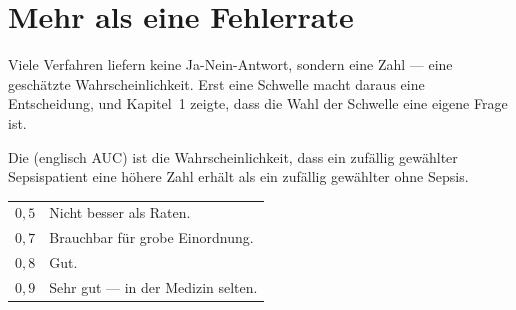 \section{Mehr als eine Fehlerrate}

\begin{merksatz}
Viele Verfahren liefern keine Ja-Nein-Antwort, sondern eine Zahl --- eine geschätzte Wahrscheinlichkeit. Erst eine Schwelle macht daraus eine Entscheidung, und Kapitel~1 zeigte, dass die Wahl der Schwelle eine eigene Frage ist.

\begin{definition}
Die  (englisch AUC) ist die Wahrscheinlichkeit, dass ein zufällig gewählter Sepsispatient eine höhere Zahl erhält als ein zufällig gewählter ohne Sepsis.
\end{definition}

\begin{center}
{\small
\renewcommand{\arraystretch}{1.5}
\begin{tabular}{@{}P{2.0cm}P{6.6cm}@{}}
\toprule
$0{,}5$ & Nicht besser als Raten.\\
$0{,}7$ & Brauchbar für grobe Einordnung.\\
$0{,}8$ & Gut.\\
$0{,}9$ & Sehr gut --- in der Medizin selten.\\
\bottomrule
\end{tabular}}
\end{center}

\begin{center}
\begin{minipage}{0.88\textwidth}
\end{minipage}
\end{center}
\end{merksatz}

